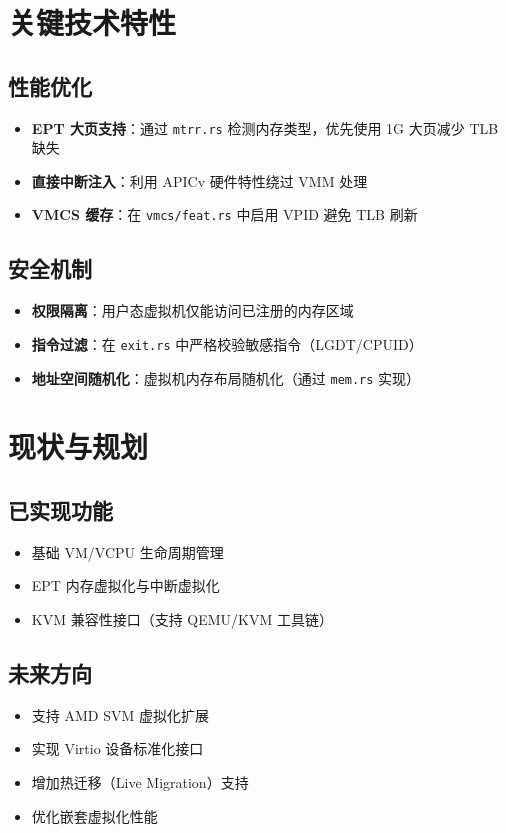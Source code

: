 \documentclass{mancls}
\begin{document}
\section{关键技术特性}
\subsection{性能优化}
\begin{itemize}
    \item \textbf{EPT 大页支持}：通过 \texttt{mtrr.rs} 检测内存类型，优先使用 1G 大页减少 TLB 缺失
    \item \textbf{直接中断注入}：利用 APICv 硬件特性绕过 VMM 处理
    \item \textbf{VMCS 缓存}：在 \texttt{vmcs/feat.rs} 中启用 VPID 避免 TLB 刷新
\end{itemize}

\subsection{安全机制}
\begin{itemize}
    \item \textbf{权限隔离}：用户态虚拟机仅能访问已注册的内存区域
    \item \textbf{指令过滤}：在 \texttt{exit.rs} 中严格校验敏感指令（LGDT/CPUID）
    \item \textbf{地址空间随机化}：虚拟机内存布局随机化（通过 \texttt{mem.rs} 实现）
\end{itemize}

\section{现状与规划}
\subsection{已实现功能}
\begin{itemize}
    \item 基础 VM/VCPU 生命周期管理
    \item EPT 内存虚拟化与中断虚拟化
    \item KVM 兼容性接口（支持 QEMU/KVM 工具链）
\end{itemize}

\subsection{未来方向}
\begin{itemize}
    \item 支持 AMD SVM 虚拟化扩展
    \item 实现 Virtio 设备标准化接口
    \item 增加热迁移（Live Migration）支持
    \item 优化嵌套虚拟化性能
\end{itemize}
\end{document}
